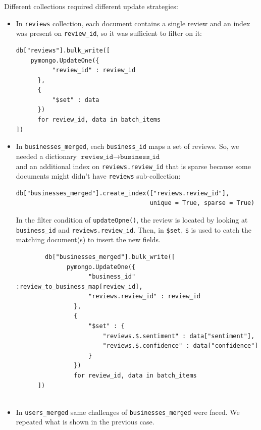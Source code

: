 \documentclass{Configuration_Files/PoliMi3i_thesis}
\begin{document}
Different collections required different update strategies:
\begin{itemize}
    \item In \texttt{reviews} collection, each document contains a single review and an index was present on \texttt{review\_id}, so it was sufficient to filter on it:
    \bigskip
    
    \begin{verbatim}
db["reviews"].bulk_write([
    pymongo.UpdateOne({
          "review_id" : review_id
      },
      {
          "$set" : data
      })
      for review_id, data in batch_items
])
    \end{verbatim}
    
    \bigskip

    \item In \texttt{businesses\_merged}, each \texttt{business\_id} maps a set of reviews. So, we needed a dictionary $\texttt{review\_id} \longrightarrow \texttt{business\_id}$ \\and an additional index on \texttt{reviews.review\_id} that is sparse because some documents might didn't have \texttt{reviews} sub-collection:
    \bigskip
    
    \begin{verbatim}
db["businesses_merged"].create_index(["reviews.review_id"], 
                                     unique = True, sparse = True)
    \end{verbatim}
    
    \bigskip
    In the filter condition of \texttt{updateOpne()}, the review is located by looking at \texttt{business\_id} and \texttt{reviews.review\_id}. Then, in \texttt{\$set}, \texttt{\$} is used to catch the matching document(s) to insert the new fields.
    \bigskip
    
    \begin{verbatim}
        db["businesses_merged"].bulk_write([
              pymongo.UpdateOne({ 
                    "business_id" :review_to_business_map[review_id],
                    "reviews.review_id" : review_id 
                },
                {
                    "$set" : {
                        "reviews.$.sentiment" : data["sentiment"],
                        "reviews.$.confidence" : data["confidence"]  
                    }
                })
                for review_id, data in batch_items
      ])
        
    \end{verbatim}
    
    \bigskip

    \item In \texttt{users\_merged} same challenges of \texttt{businesses\_merged} were faced. We repeated what is shown in the previous case.
\end{itemize}
\end{document}
